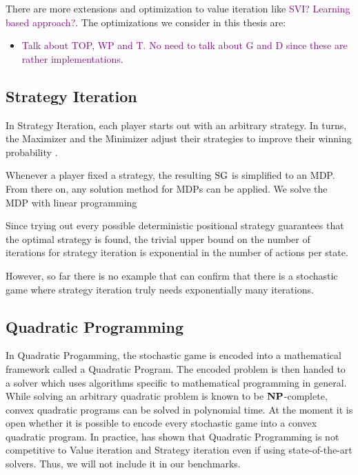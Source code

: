 There are more extensions and optimization to value iteration like \textcolor{purple}{SVI? Learning based approach?}.
The optimizations we consider in this thesis are:
\begin{itemize}
	\item \textcolor{purple}{Talk about TOP, WP and T. No need to talk about G and D since these are rather implementations.}
\end{itemize}

\subsection{Strategy Iteration}
In Strategy Iteration, each player starts out with an arbitrary strategy.
In turns, the Maximizer and the Minimizer adjust their strategies to 
improve their winning probability \cite{condonQP}.

Whenever a player fixed a strategy, the resulting $\textrm{SG}$ is simplified to an MDP. 
From there on, any solution method for MDPs can be applied.
We solve the MDP with linear programming \cite{Citation to any LP-solving explanation for MDPs. Maybe Puterman?}

Since trying out every possible deterministic positional strategy guarantees that the optimal strategy is found,
the trivial upper bound on the number of iterations for strategy iteration is exponential in the number of actions per state.

However, so far there is no example that can confirm that there is a stochastic game where strategy iteration truly needs exponentially many iterations.

\subsection{Quadratic Programming}
In Quadratic Progamming, the stochastic game is encoded into a mathematical framework called a Quadratic Program. 
The encoded problem is then handed to a solver which uses algorithms specific to mathematical programming in general.
While solving an arbitrary quadratic problem is known to be $\mathbf{NP}$-complete, convex quadratic programs can be solved in polynomial time.
At the moment it is open whether it is possible to encode every stochastic game into a convex quadratic program.
In practice, \cite{Gandalf} has shown that Quadratic Programming is not competitive to Value iteration and Strategy iteration even if using 
state-of-the-art solvers. Thus, we will not include it in our benchmarks.


